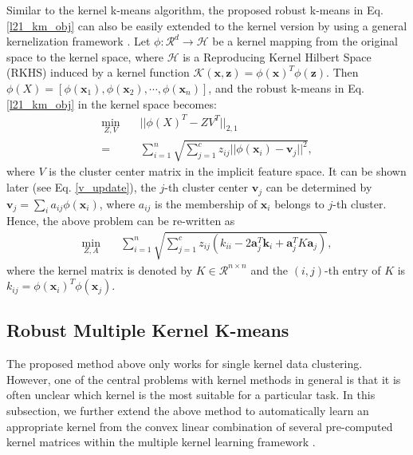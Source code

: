 \documentclass{article}
\begin{document}
Similar to the kernel k-means algorithm, the proposed robust k-means in Eq. \eqref{l21_km_obj} can also be easily extended to the kernel version by using a general kernelization framework \cite{zhang2010general}. Let $\phi : \mathcal{R}^{d} \rightarrow \mathcal{H}$ be a kernel mapping from the original space to the kernel space, where $\mathcal{H}$ is a Reproducing Kernel Hilbert Space (RKHS) induced by a kernel function $\mathcal{K}(\bm{x}, \bm{z}) = \phi(\bm{x})^T \phi(\bm{z})$. Then $\phi(X) = [\phi(\bm{x}_1), \phi(\bm{x}_2), \cdots, \phi(\bm{x}_n)]$, and the robust k-means in Eq. \eqref{l21_km_obj} in the kernel space becomes:
\begin{align}\label{l21_kkm}
     \min_{Z,V} \quad  &||\phi(X)^T - Z  V^T||_{2,1} \\
   =& \sum_{i=1}^{n}\sqrt{\sum_{j=1}^{c}z_{ij}||\phi(\bm{x}_i) - \bm{v}_j||^2}, \nonumber
\end{align}
where $V$ is the cluster center matrix in the implicit feature space. It can be shown later (see Eq. \eqref{v_update}), the $j$-th cluster center $\bm{v}_j$ can be determined by $\bm{v}_j = \sum_{i} a_{ij} \phi(\bm{x}_i)$, where $a_{ij}$ is the membership of $\bm{x}_i$ belongs to $j$-th cluster. Hence, the above problem can be re-written as
\begin{align}\label{rkkm}
    \min_{Z,A} \quad & \sum_{i=1}^{n} \sqrt{\sum_{j=1}^{c} z_{ij} (k_{ii} - 2 \bm{a}_{j}^{T} \bm{k}_{i}  + \bm{a}_{j}^{T} K \bm{a}_{j})},
\end{align}
where the kernel matrix is denoted by $K \in \mathcal{R}^{n \times n}$ and the $(i,j)$-th entry of $K$ is $k_{ij} = \phi(\bm{x}_i)^T \phi(\bm{x}_j)$.

\subsection{Robust Multiple Kernel K-means}
The proposed method above only works for single kernel data clustering. However, one of the central problems with kernel methods in general is that it is often unclear which kernel is the most suitable for a particular task. In this subsection, we further extend the above method to automatically learn an appropriate kernel from the convex linear combination of several pre-computed kernel matrices within the multiple kernel learning framework \cite{gonen2011multiple}.
\end{document}
